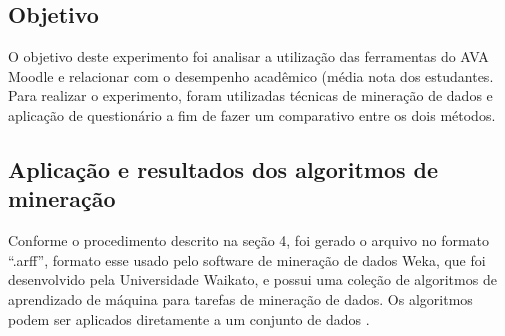 \documentclass[12pt]{article}
\begin{document}
\subsection{Objetivo}

O objetivo deste experimento foi analisar a utilização das ferramentas do AVA Moodle e relacionar com o desempenho acadêmico (média nota dos estudantes. Para realizar o experimento, foram utilizadas técnicas de mineração de dados e aplicação de questionário a fim de fazer um comparativo entre os dois métodos. 

\subsection{Aplicação e resultados dos algoritmos de mineração}

Conforme o procedimento descrito na seção 4, foi gerado o arquivo no formato ``.arff'', formato esse usado pelo software de mineração de dados Weka, que foi desenvolvido pela Universidade Waikato, e possui uma coleção de algoritmos de aprendizado de máquina para tarefas de mineração de dados. Os algoritmos podem ser aplicados diretamente a um conjunto de dados \cite{Weka:2014}. 
\end{document}
